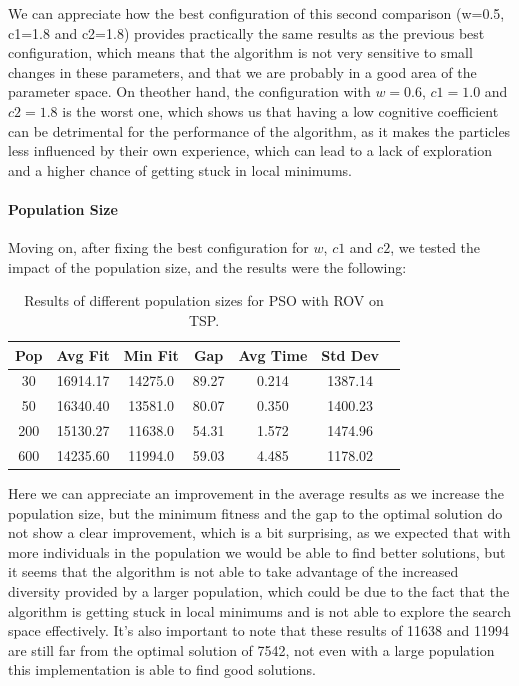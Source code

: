\documentclass[12pt,a4paper]{article}
\begin{document}
We can appreciate how the best configuration of this second comparison (w=0.5, c1=1.8 and c2=1.8) provides practically the same results as the previous best configuration, which means that the algorithm is not very sensitive to small changes in these parameters, and that we are probably in a good area of the parameter space.
On theother hand, the configuration with $w=0.6$, $c1=1.0$ and $c2=1.8$ is the worst one, which shows us that having a low cognitive coefficient can be detrimental for the performance of the algorithm, as it makes the particles less influenced by their own experience, which can lead to a lack of exploration and a higher chance of getting stuck in local minimums.

\paragraph{Population Size}
Moving on, after fixing the best configuration for $w$, $c1$ and $c2$, we tested the impact of the population size, and the results were the following:
\begin{table}[H]
        \centering
        \begin{tabular}{c c c c c c c}
        \hline
        \textbf{Pop} & \textbf{Avg Fit} & \textbf{Min Fit} & \textbf{Gap} & \textbf{Avg Time} & \textbf{Std Dev} \\
        \hline
        30  & 16914.17 & 14275.0 & 89.27 & 0.214 & 1387.14 \\
        50  & 16340.40 & 13581.0 & 80.07 & 0.350 & 1400.23 \\
        200 & 15130.27 & 11638.0 & 54.31 & 1.572 & 1474.96 \\
        600 & 14235.60 & 11994.0 & 59.03 & 4.485 & 1178.02 \\
        \hline
        \end{tabular}
        \caption{Results of different population sizes for PSO with ROV on TSP.}
\end{table}
Here we can appreciate an improvement in the average results as we increase the population size, but the minimum fitness and the gap to the optimal solution do not show a clear improvement, which is a bit surprising, as we expected that with more individuals in the population we would be able to find better solutions, but it seems that the algorithm is not able to take advantage of the increased diversity provided by a larger population, which could be due to the fact that the algorithm is getting stuck in local minimums and is not able to explore the search space effectively.
It's also important to note that these results of 11638 and 11994 are still far from the optimal solution of 7542, not even with a large population this implementation is able to find good solutions.
\end{document}
